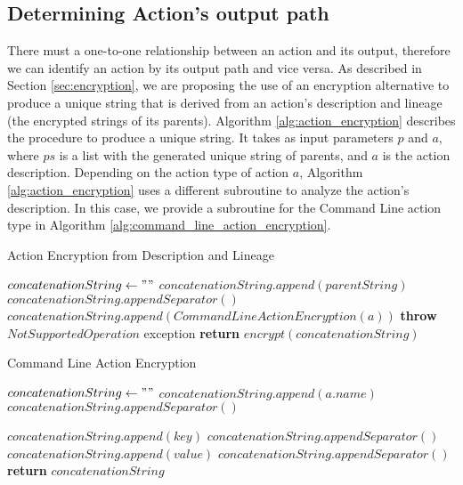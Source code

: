 \subsection{Determining Action's output path}
There must a one-to-one relationship between an action and its output, therefore we can identify an action by its output path and vice versa. As described in Section \ref{sec:encryption}, we are proposing the use of an encryption alternative to produce a unique string that is derived from an action's description and lineage (the encrypted strings of its parents). Algorithm \ref{alg:action_encryption} describes the procedure to produce a unique string.  It takes as input parameters $p$ and $a$, where $ps$ is a list with the generated unique string of parents, and $a$ is the action description.  Depending on the action type of action $a$, Algorithm \ref{alg:action_encryption} uses a different subroutine to analyze the action's description. In this case, we provide a subroutine for the Command Line action type in Algorithm \ref{alg:command_line_action_encryption}.

\begin{algorithm}
\begin{singlespace}
\caption{Action Encryption from Description and Lineage}
\label{alg:action_encryption}
\begin{algorithmic}[1]
\State $concatenationString \gets ""$
	\State $concatenationString.append(parentString)$
	\State $concatenationString.appendSeparator()$
\EndFor
{}
	\State $concatenationString.append(CommandLineActionEncryption(a))$
\Else
	\State \textbf{throw} $NotSupportedOperation$ exception
\EndIf
\State \textbf{return} $encrypt(concatenationString)$

\EndProcedure
\end{algorithmic}
\end{singlespace}
\end{algorithm}

\begin{algorithm}
\begin{singlespace}
\caption{Command Line Action Encryption}
\label{alg:command_line_action_encryption}
\begin{algorithmic}[1]
\State $concatenationString \gets " "$
\State $concatenationString.append(a.name)$
\State $concatenationString.appendSeparator()$

	\State $concatenationString.append(key)$
	\State $concatenationString.appendSeparator()$
	\State $concatenationString.append(value)$
	\State $concatenationString.appendSeparator()$
\EndFor
	\State \textbf{return} $concatenationString$
\EndProcedure
\end{algorithmic}
\end{singlespace}
\end{algorithm}

